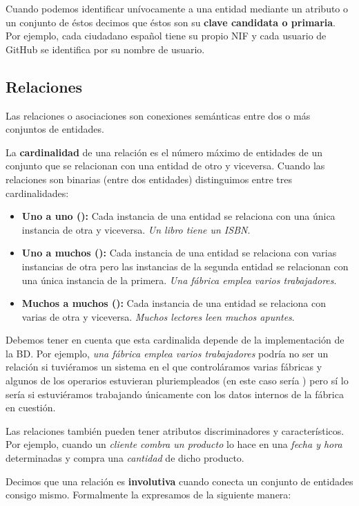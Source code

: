 Cuando podemos identificar unívocamente a una entidad mediante un atributo o un conjunto de éstos decimos que éstos son su \textbf{clave candidata o primaria}.
Por ejemplo, cada ciudadano español tiene su propio NIF y cada usuario de GitHub se identifica por su nombre de usuario.

\subsection{Relaciones}

Las relaciones o asociaciones son conexiones semánticas entre dos o más conjuntos de entidades.

La \textbf{cardinalidad} de una relación es el número máximo de entidades de un conjunto que se relacionan con una entidad de otro y viceversa.
Cuando las relaciones son binarias (entre dos entidades) distinguimos entre tres cardinalidades:

\begin{itemize}
	\item\textbf{Uno a uno ():} Cada instancia de una entidad se relaciona con una única instancia de otra y viceversa. \textit{Un libro tiene un ISBN}.
	\item\textbf{Uno a muchos ():} Cada instancia de una entidad se relaciona con varias instancias de otra pero las instancias de la segunda entidad se relacionan con una única instancia de la primera. \textit{Una fábrica emplea varios trabajadores}.
	\item\textbf{Muchos a muchos ():} Cada instancia de una entidad se relaciona con varias de otra y viceversa. \textit{Muchos lectores leen muchos apuntes}.
\end{itemize}

Debemos tener en cuenta que esta cardinalida depende de la implementación de la BD\@.
Por ejemplo, \textit{una fábrica emplea varios trabajadores} podría no ser un relación  si tuviéramos un sistema en el que controláramos varias fábricas y algunos de los operarios estuvieran pluriempleados (en este caso sería ) pero sí lo sería si estuviéramos trabajando únicamente con los datos internos de la fábrica en cuestión.

Las relaciones también pueden tener atributos discriminadores y característicos.
Por ejemplo, cuando un \textit{cliente combra un producto} lo hace en una \textit{fecha y hora} determinadas y compra una \textit{cantidad} de dicho producto.

Decimos que una relación es \textbf{involutiva} cuando conecta un conjunto de entidades consigo mismo.
Formalmente la expresamos de la siguiente manera:

